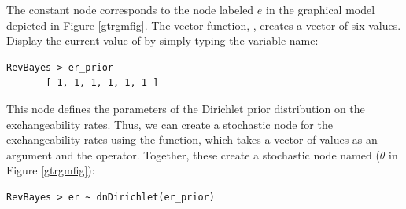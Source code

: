 The constant node  corresponds to the node labeled $e$ in the graphical model depicted in Figure \ref{gtrgmfig}. 
The vector function, , creates a vector of six values. 
Display the current value of  by simply typing the variable name:
{\tt \begin{snugshade*}
\begin{lstlisting}
RevBayes > er_prior
       [ 1, 1, 1, 1, 1, 1 ]
\end{lstlisting}
\end{snugshade*}}
This node defines the parameters of the Dirichlet prior distribution on the exchangeability rates. Thus, we can create a stochastic node for the exchangeability rates using the  function, which takes a vector of values as an argument and the \cl{\rbdn} operator. Together, these create a stochastic node named  ($\theta$ in Figure \ref{gtrgmfig}): 
{\tt \begin{snugshade*}
\begin{lstlisting}
RevBayes > er ~ dnDirichlet(er_prior)
\end{lstlisting}
\end{snugshade*}}


